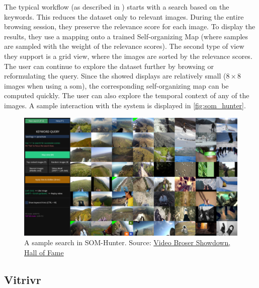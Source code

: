 The typical workflow (as described in \cite{kratochvil2020som}) starts with a search based on the keywords. This reduces the dataset only to relevant images. During the entire browsing session, they preserve the relevance score for each image. To display the results, they use a mapping onto a trained Self-organizing Map (where samples are sampled with the weight of the relevance scores). The second type of view they support is a grid view, where the images are sorted by the relevance scores. The user can continue to explore the dataset further by browsing or reformulating the query. Since the showed displays are relatively small ($8\times8$ images when using a \acrshort{som}), the corresponding self-organizing map can be computed quickly. The user can also explore the temporal context of any of the images. A sample interaction with the system is displayed in \autoref{fig:som_hunter}.


\begin{figure}
    \centering
    \includegraphics[width=0.99\linewidth]{img/som_hunter_small.png}
    \caption[A sample search in SOM-Hunter]{A sample search in SOM-Hunter. Source: \href{https://videobrowsershowdown.org/hall-of-fame/}{Video Broser Showdown, Hall of Fame}}
    \label{fig:som_hunter}
\end{figure}

\subsection{Vitrivr}

